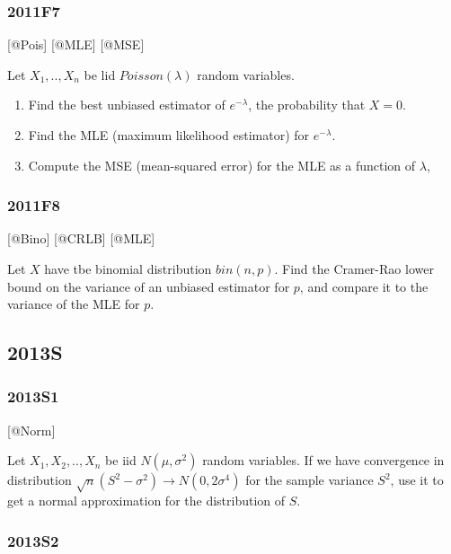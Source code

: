 \documentclass[6pt,Portrait]{article}
\begin{document}
\hypertarget{f7-4}{%
\subsubsection{2011F7}\label{f7-4}}

{[}@Pois{]} {[}@MLE{]} {[}@MSE{]}

Let \(X_1,..,X_{n}\) be lid \(Poisson(\lambda)\) random variables.

\begin{enumerate}
\def\labelenumi{(\alph{enumi})}
\item
  Find the best unbiased estimator of \(e^{-\lambda}\), the probability
  that \(X=0\).
\item
  Find the MLE (maximum likelihood estimator) for \(e^{-\lambda}\).
\item
  Compute the MSE (mean-squared error) for the MLE as a function of
  \(\lambda\),
\end{enumerate}

\hypertarget{f8-3}{%
\subsubsection{2011F8}\label{f8-3}}

{[}@Bino{]} {[}@CRLB{]} {[}@MLE{]}

Let \(X\) have tbe binomial distribution \(bin(n,p)\). Find the
Cramer-Rao lower bound on the variance of an unbiased estimator for
\(p\), and compare it to the variance of the MLE for \(p\).

\hypertarget{s-6}{%
\subsection{2013S}\label{s-6}}

\hypertarget{s1-3}{%
\subsubsection{2013S1}\label{s1-3}}

{[}@Norm{]}

Let \(X_1,X_2,..,X_{n}\) be iid \(N(\mu,\sigma^2)\) random variables. If
we have convergence in distribution
\(\sqrt{n}(S^2-\sigma^2)\to N(0,2\sigma^4)\) for the sample variance
\(S^2\), use it to get a normal approximation for the distribution of
\(S\).

\hypertarget{s2-3}{%
\subsubsection{2013S2}\label{s2-3}}
\end{document}
